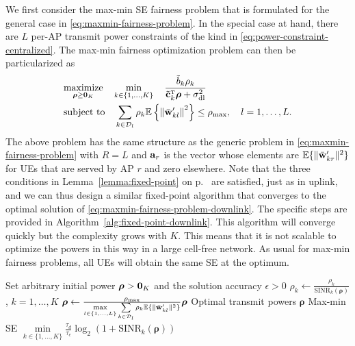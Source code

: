 We first consider the max-min SE fairness problem that is formulated for the general case in \eqref{eq:maxmin-fairness-problem}. In the special case at hand, there are $L$ per-AP transmit power constraints of the kind in \eqref{eq:power-constraint-centralized}. 
The max-min fairness optimization problem can then be particularized as
\begin{align} \label{eq:maxmin-fairness-problem-downlink}
&\underset{\boldsymbol{\rho} \geq \vect{0}_K}{\textrm{maximize}} \quad \min\limits_{k\in \{1,\ldots,K\}} \quad \frac{\tilde{b}_k\rho_k}{\tilde{\vect{c}}_k^{\Ttran}\boldsymbol{\rho}+\sigmaDL} \\
&\textrm{subject to} \quad \sum_{k\in \mathcal{D}_l}\rho_k \mathbb{E} \left\{ \left\| \bar{\vect{w}}_{kl}^{\prime} \right\|^2\right\}\leq \rhomax, \quad l=1,\ldots,L.  \nonumber
\end{align}
The above problem has the same structure as the generic problem in \eqref{eq:maxmin-fairness-problem} with $R=L$ and $\mathbf{a}_r$ is the vector whose elements are
 $\mathbb{E} \{ \| \bar{\mathbf{w}}_{kr}^{\prime} \|^2\}$ for UEs that are served by AP $r$ and zero elsewhere. Note that the three conditions in Lemma~\ref{lemma:fixed-point} on p.~\pageref{lemma:fixed-point} are satisfied, just as in uplink, and we can thus design a similar fixed-point algorithm that converges to the optimal solution of \eqref{eq:maxmin-fairness-problem-downlink}. The specific steps are provided in Algorithm~\ref{alg:fixed-point-downlink}. This algorithm will converge quickly but the complexity grows with $K$. This means that it is not scalable to optimize the powers in this way in a large cell-free network.
As usual for max-min fairness problems, all UEs will obtain the same SE at the optimum. 

\begin{algorithm}
	\caption{Fixed-point algorithm for solving the centralized downlink max-min fairness problem in \eqref{eq:maxmin-fairness-problem-downlink}.} \label{alg:fixed-point-downlink}
	\begin{algorithmic}[1]
		 Set arbitrary initial power $\boldsymbol{\rho}>\mathbf{0}_K$ and the solution accuracy $\epsilon>0$
		\State $\rho_k \gets \frac{\rho_k}{\textrm{SINR}_k\left(\boldsymbol{\rho}\right)}$, $k=1,\ldots,K$
		\State $\boldsymbol{\rho} \gets \frac{\rho_{\rm max}}{\underset{l\in\{1,\ldots,L\}}{\max}\sum\limits_{k\in \mathcal{D}_l}\rho_k \mathbb{E} \{ \| \bar{\mathbf{w}}_{kl}^{\prime} \|^2\}}\boldsymbol{\rho}$
		\EndWhile
		 Optimal transmit powers $\boldsymbol{\rho}$
			\State Max-min SE $\underset{k\in\{1,\ldots,K\}}{\min} \frac{\tau_d}{\tau_c}\log_2\left(1+ \textrm{SINR}_k\left(\boldsymbol{\rho}\right)\right)$
	\end{algorithmic}
\end{algorithm}





